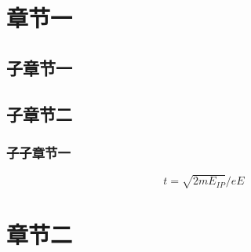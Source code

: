 \section{章节一}
\pagestyle{plain}
\setcounter{page}{1}%
\subsection{子章节一}
\cite{page1}
\subsection{子章节二}

\cite{page2}
\subsubsection{子子章节一}
\begin{equation}
t=\sqrt{2mE_{IP}}/{eE}
\end{equation}
\cite{page3}
\section{章节二}
\cite{page4}
